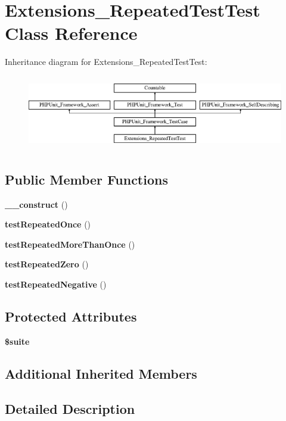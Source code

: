 \section{Extensions\+\_\+\+Repeated\+Test\+Test Class Reference}
\label{class_extensions___repeated_test_test}
Inheritance diagram for Extensions\+\_\+\+Repeated\+Test\+Test\+:\begin{figure}[H]
\begin{center}
\leavevmode
\includegraphics[height=3.303835cm]{class_extensions___repeated_test_test}
\end{center}
\end{figure}
\subsection*{Public Member Functions}
\begin{DoxyCompactItemize}
\item 
{\bf \+\_\+\+\_\+construct} ()
\item 
{\bf test\+Repeated\+Once} ()
\item 
{\bf test\+Repeated\+More\+Than\+Once} ()
\item 
{\bf test\+Repeated\+Zero} ()
\item 
{\bf test\+Repeated\+Negative} ()
\end{DoxyCompactItemize}
\subsection*{Protected Attributes}
\begin{DoxyCompactItemize}
\item 
{\bf \$suite}
\end{DoxyCompactItemize}
\subsection*{Additional Inherited Members}


\subsection{Detailed Description}


